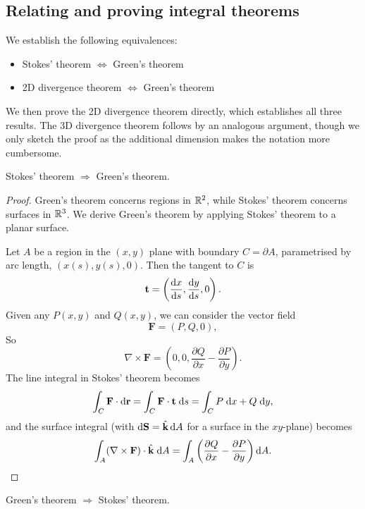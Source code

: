 \documentclass[a4paper]{article}
\begin{document}
\subsection{Relating and proving integral theorems}
\begin{rmk}
  We establish the following equivalences:
  \begin{itemize}
    \item Stokes' theorem $\Leftrightarrow$ Green's theorem
    \item 2D divergence theorem $\Leftrightarrow$ Green's theorem
  \end{itemize}
  We then prove the 2D divergence theorem directly, which establishes all three results. The 3D divergence theorem follows by an analogous argument, though we only sketch the proof as the additional dimension makes the notation more cumbersome.
\end{rmk}

\begin{prop}
  Stokes' theorem $\Rightarrow$ Green's theorem.
\end{prop}

\begin{proof}
  Green's theorem concerns regions in $\mathbb{R}^2$, while Stokes' theorem concerns surfaces in $\mathbb{R}^3$. We derive Green's theorem by applying Stokes' theorem to a planar surface.

  Let $A$ be a region in the $(x, y)$ plane with boundary $C = \partial A$, parametrised by arc length, $(x(s), y(s), 0)$. Then the tangent to $C$ is
  \[
    \mathbf{t} = \left(\frac{\mathrm{d} x}{\mathrm{d} s}, \frac{\mathrm{d} y}{\mathrm{d} s}, 0\right).
  \]
  Given any $P(x, y)$ and $Q(x, y)$, we can consider the vector field
  \[
    \mathbf{F} = (P, Q, 0),
  \]
  So
  \[
    \nabla \times \mathbf{F} = \left(0, 0, \frac{\partial Q}{\partial x} - \frac{\partial P}{\partial y}\right).
  \]
  The line integral in Stokes' theorem becomes
  \[
    \int_C \mathbf{F} \cdot \mathrm{d} \mathbf{r} = \int_C \mathbf{F}\cdot \mathbf{t}\;\mathrm{d} s = \int_C P\;\mathrm{d} x + Q\;\mathrm{d} y,
  \]
  and the surface integral (with $\mathrm{d}\mathbf{S} = \hat{\mathbf{k}}\,\mathrm{d} A$ for a surface in the $xy$-plane) becomes
  \[
    \int_A (\nabla\times \mathbf{F})\cdot \hat{\mathbf{k}}\;\mathrm{d} A = \int_A \left(\frac{\partial Q}{\partial x} - \frac{\partial P}{\partial y}\right)\mathrm{d} A.\qedhere
  \]
\end{proof}

\begin{prop}
  Green's theorem $\Rightarrow$ Stokes' theorem.
\end{prop}
\end{document}
